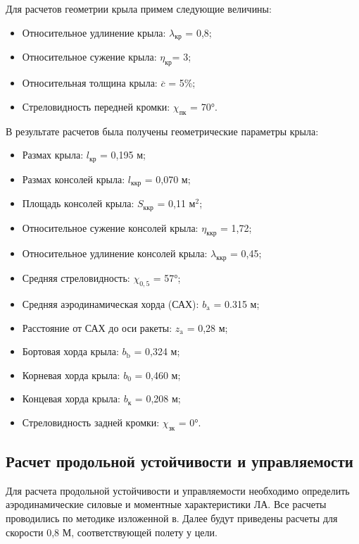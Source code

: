 Для расчетов геометрии крыла примем следующие величины:
\begin{itemize}
	\item Относительное удлинение крыла:		$	\lambda_\text{кр} $ = 0,8;
	\item Относительное сужение крыла:			$	\eta_\text{кр} $= 3;
	\item Относительная толщина крыла:			$	\overline{c} $ = 5\%;
	\item Стреловидность передней кромки:		$	\chi_\text{пк}$ = 70°.
\end{itemize}

В результате расчетов была получены геометрические параметры крыла:
\begin{itemize}
	\item Размах крыла:							$l_\text{кр}$ = 0,195 м;
	\item Размах консолей крыла:					$l_\text{ккр}$ = 0,070 м;
	\item Площадь консолей крыла:					$S_\text{ккр}$ = 0,11 $\text{м}^2$;
	\item Относительное сужение консолей крыла:	$	\eta_\text{ккр}$ = 1,72;
	\item Относительное удлинение консолей крыла:	$	\lambda_\text{ккр}$ = 0,45;
	\item Средняя стреловидность:					$\chi_{0,5}$ = 57°;
	\item Средняя аэродинамическая хорда (САХ):	$	b_\text{a}$ = 0.315 м;
	\item Расстояние от САХ до оси ракеты:			$	z_\text{a}$ = 0,28 м;
	\item Бортовая хорда крыла:					$	b_\text{b}$ = 0,324 м;
	\item Корневая хорда крыла:					$	b_\text{0}$ = 0,460 м;
	\item Концевая хорда крыла:					$	b_\text{к}$ = 0,208 м;
	\item Стреловидность задней кромки:			$	\chi_\text{зк}$ = 0°.
\end{itemize}

\subsection{Расчет продольной устойчивости и управляемости}
Для расчета продольной устойчивости и управляемости необходимо определить аэродинамические силовые и моментные характеристики ЛА. Все расчеты проводились по методике изложенной в. Далее будут приведены расчеты для скорости 0,8 М, соответствующей полету у цели.

